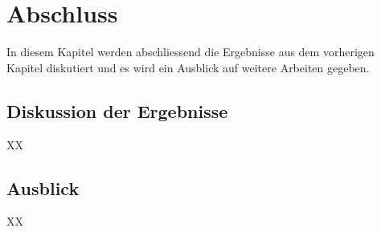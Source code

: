\chapter{Abschluss}
\label{chapter:conclusion}
In diesem Kapitel werden abschliessend die Ergebnisse aus dem vorherigen Kapitel diskutiert und es wird ein Ausblick auf weitere Arbeiten gegeben.

\section{Diskussion der Ergebnisse}
XX

\section{Ausblick}
XX


